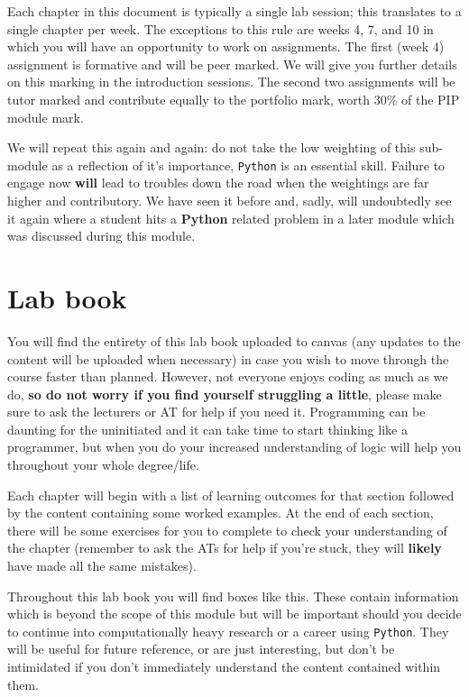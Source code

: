 Each chapter in this document is typically a single lab session; this translates to a single chapter per week. The exceptions to this rule are weeks 4, 7, and 10 in which you will have an opportunity to work on assignments.
The first (week 4) assignment is formative and will be peer marked.
We will give you further details on this marking in the introduction sessions.
The second two assignments will be tutor marked and contribute equally to the
portfolio mark, worth 30\% of the PIP module mark.

We will repeat this again and again: do not take the low weighting of this sub-module as a reflection of it's importance, \texttt{Python} is an essential skill. Failure to engage now \textbf{will} lead to troubles down the road when the weightings are far higher and contributory. We have seen it before and, sadly, will undoubtedly see it again where a student hits a \textbf{Python} related problem in a later module which was discussed during this module. 

\section*{Lab book}
You will find the entirety of this lab book uploaded to canvas (any updates to the content will be uploaded when necessary) in case you wish to move through the course faster than planned. However, not everyone enjoys coding as much as we do, \textbf{so do not worry if you find yourself struggling a little}, please make sure to ask the lecturers or AT for help if you need it. Programming can be daunting for the uninitiated and it can take time to start thinking like a programmer, but when you do your increased understanding of logic will help you throughout your whole degree/life.

Each chapter will begin with a list of learning outcomes for that section followed by the content containing some worked examples. At the end of each section, there will be some exercises for you to complete to check your understanding of the chapter (remember to ask the ATs for help if you're stuck, they will \textbf{likely} have made all the same mistakes).

\begin{tcolorbox}[colback=red!5!white,colframe=red!75!black]

Throughout this lab book you will find boxes like this. These contain information which is beyond the scope of this module but will be important should you decide to continue into computationally heavy research or a career using \texttt{Python}. They will be useful for future reference, or are just interesting, but don't be intimidated if you don't immediately understand the content contained within them.
	
\end{tcolorbox}

